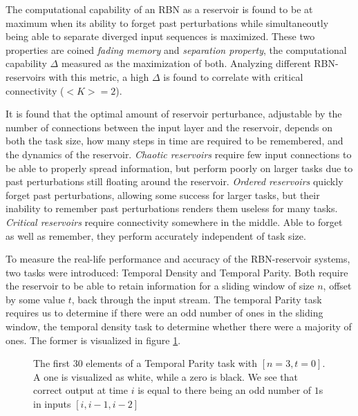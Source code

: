 The computational capability of an RBN as a reservoir is found to be at maximum when its ability to forget past perturbations
while simultaneoutly being able to separate diverged input sequences is maximized.
These two properties are coined \textit{fading memory} and \textit{separation property},
the computational capability $\Delta$ measured as the maximization of both.
Analyzing different RBN-reservoirs with this metric,
a high $\Delta$ is found to correlate with critical connectivity ($<K>=2$).

It is found that the optimal amount of reservoir perturbance,
adjustable by the number of connections between the input layer and the reservoir,
depends on both the task size, how many steps in time are required to be remembered,
and the dynamics of the reservoir.
\textit{Chaotic reservoirs} require few input connections to be able to properly spread information,
but perform poorly on larger tasks due to past perturbations still floating around the reservoir.
\textit{Ordered reservoirs} quickly forget past perturbations, allowing some success for larger tasks,
but their inability to remember past perturbations renders them useless for many tasks.
\textit{Critical reservoirs} require connectivity somewhere in the middle.
Able to forget as well as remember, they perform accurately independent of task size.

To measure the real-life performance and accuracy of the RBN-reservoir systems, two tasks were introduced: Temporal Density and Temporal Parity.
Both require the reservoir to be able to retain information for a sliding window of size $ n $,
offset by some value $ t $, back through the input stream.
The temporal Parity task requires us to determine if there were an odd number of ones in the sliding window,
the temporal density task to determine whether there were a majority of ones.
The former is visualized in figure \ref{figure:temporal-parity}.

\begin{figure}


  \caption{
    The first 30 elements of a Temporal Parity task with $[n=3, t=0]$.
    A one is visualized as white, while a zero is black.
    We see that correct output at time $i$ is equal to there being an odd number of $1$s in inputs $[i, i-1, i-2]$
  }
  \label{figure:temporal-parity}
\end{figure}
